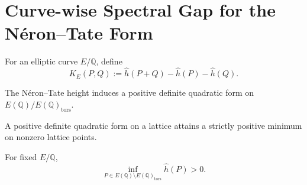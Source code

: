 \section*{Curve-wise Spectral Gap for the Néron--Tate Form}

\begin{definition}
For an elliptic curve $E/\mathbb Q$, define
\[
K_E(P,Q) := \hat h(P+Q) - \hat h(P) - \hat h(Q).
\]
\end{definition}

\begin{lemma}
The Néron--Tate height induces a positive definite quadratic form on
$E(\mathbb Q)/E(\mathbb Q)_{\mathrm{tors}}$.
\end{lemma}

\begin{lemma}
A positive definite quadratic form on a lattice attains a strictly positive minimum on nonzero lattice points.
\end{lemma}

\begin{theorem}
For fixed $E/\mathbb Q$,
\[
\inf_{P \in E(\mathbb Q)\setminus E(\mathbb Q)_{\mathrm{tors}}} \hat h(P) > 0 .
\]
\end{theorem}

